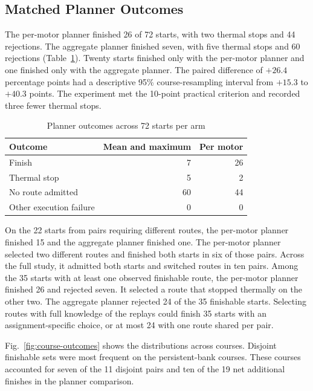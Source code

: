 \documentclass{ieeeaccess}
\begin{document}
\subsection{Matched Planner Outcomes}

The per-motor planner finished 26 of 72 starts, with two thermal stops and 44 rejections. The aggregate planner finished seven, with five thermal stops and 60 rejections (Table~\ref{tab:planner-results}). Twenty starts finished only with the per-motor planner and one finished only with the aggregate planner. The paired difference of $+26.4$ percentage points had a descriptive 95\% course-resampling interval from $+15.3$ to $+40.3$ points. The experiment met the 10-point practical criterion and recorded three fewer thermal stops.

\begin{table}[!t]
\caption{Planner outcomes across 72 starts per arm}
\label{tab:planner-results}
\centering
\footnotesize
\renewcommand{\arraystretch}{1.13}
\begin{tabular}{@{}lrr@{}}
\hline
Outcome & Mean and maximum & Per motor \\
\hline
Finish & 7 & 26 \\
Thermal stop & 5 & 2 \\
No route admitted & 60 & 44 \\
Other execution failure & 0 & 0 \\
\hline
\end{tabular}
\end{table}

On the 22 starts from pairs requiring different routes, the per-motor planner finished 15 and the aggregate planner finished one. The per-motor planner selected two different routes and finished both starts in six of those pairs. Across the full study, it admitted both starts and switched routes in ten pairs. Among the 35 starts with at least one observed finishable route, the per-motor planner finished 26 and rejected seven. It selected a route that stopped thermally on the other two. The aggregate planner rejected 24 of the 35 finishable starts. Selecting routes with full knowledge of the replays could finish 35 starts with an assignment-specific choice, or at most 24 with one route shared per pair.

Fig.~\ref{fig:course-outcomes} shows the distributions across courses. Disjoint finishable sets were most frequent on the persistent-bank courses. These courses accounted for seven of the 11 disjoint pairs and ten of the 19 net additional finishes in the planner comparison.
\end{document}
